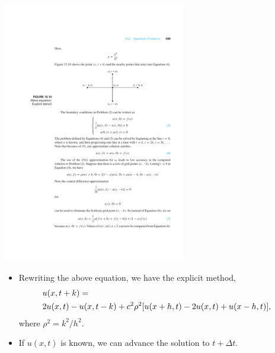 \documentclass{beamer}
\newcommand{\beforeverb}{\footnotesize}
\newcommand{\afterverb}{\normalsize}
\begin{document}
\begin{frame}
\centerline{\includegraphics[width=0.6\textwidth]{WaveEqnExplicit.pdf}}
\begin{itemize}
    \item Rewriting the above equation, we have the explicit method,
    \beforeverb
    \begin{align*}
    \lefteqn{u(x, t+k)=}\\
    &2 u(x, t)-u(x, t-k)+c^2 \rho^2[u(x+h, t)-2 u(x, t)+u(x-h, t)],
    \end{align*}
    \afterverb
    where $\rho^2=k^2/h^2$.
    \item If $u(x,t)$ is known, we can advance the solution to $t+\Delta t$.
\end{itemize}
\end{frame}
\end{document}
